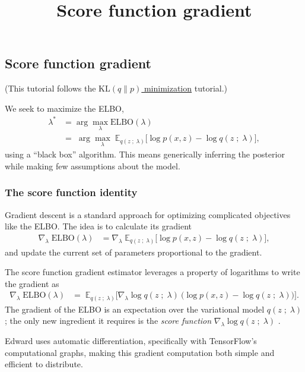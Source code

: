 \title{Score function gradient}

\subsection{Score function gradient}

(This tutorial follows the
\href{/tutorials/klqp}{$\text{KL}(q\|p)$ minimization} tutorial.)

We seek to maximize the ELBO,
\begin{align*}
  \lambda^*
  &=
  \arg \max_\lambda \text{ELBO}(\lambda)\\
  &=\;
  \arg \max_\lambda\;
  \mathbb{E}_{q(z\;;\;\lambda)}
  \big[
  \log p(x, z)
  -
  \log q(z\;;\;\lambda)
  \big],
\end{align*}
using a ``black box'' algorithm. This means generically inferring the
posterior while making few assumptions about the model.

\subsubsection{The score function identity}

Gradient descent is a standard approach for optimizing complicated
objectives like the ELBO. The idea is to calculate its gradient
\begin{align*}
  \nabla_\lambda\;
  \text{ELBO}(\lambda)
  &=
  \nabla_\lambda\;
  \mathbb{E}_{q(z\;;\;\lambda)}
  \big[
  \log p(x, z)
  -
  \log q(z\;;\;\lambda)
  \big],
\end{align*}
and update the current set of parameters proportional to the gradient.

The score function gradient estimator leverages a property of
logarithms to write the gradient as
\begin{align*}
  \nabla_\lambda\;
  \text{ELBO}(\lambda)
  &=\;
  \mathbb{E}_{q(z\;;\;\lambda)}
  \big[
  \nabla_\lambda \log q(z\;;\;\lambda)
  \:
  \big(
  \log p(x, z)
  -
  \log q(z\;;\;\lambda)
  \big)
  \big].
\end{align*}
The gradient of the ELBO is an expectation over the variational
model $q(z\;;\;\lambda)$; the only new ingredient it requires is the
\emph{score function} $\nabla_\lambda \log q(z\;;\;\lambda)$
\citep{paisley2012variational,ranganath2014black}.

Edward uses automatic differentiation, specifically with TensorFlow's
computational graphs, making this gradient computation both simple and
efficient to distribute.

